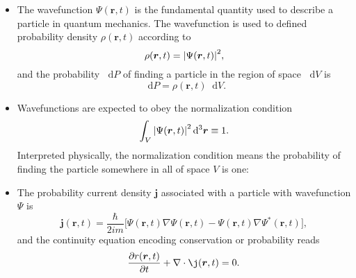\documentclass[11pt, a4paper]{article}
\newcommand{\diff}{\mathop{}\!\mathrm{d}} %
\newcommand{\dr}{\diff^{3} \r}  %
\renewcommand{\div}{\nabla \cdot}
\renewcommand{\grad}{\nabla}
\renewcommand{\vec}[1]{\bm{#1}}  %
\renewcommand{\r}{\vec{r}}  %
\renewcommand{\P}{\Psi}  %
\begin{document}
\begin{itemize}
    \item The wavefunction $ \Psi(\r, t) $ is the fundamental quantity used to describe a particle in quantum mechanics. The wavefunction is used to defined probability density $ \rho(\r, t) $ according to
	\begin{equation*}
		\rho (\r, t) = \abs{\P(\r, t)}^{2},
	\end{equation*}
	and the probability $ \diff P $ of finding a particle in the region of space $ \diff V $ is
	\begin{equation*}
		\diff P = \rho(\r, t) \diff V.
	\end{equation*}

    \item Wavefunctions are expected to obey the normalization condition
	\begin{equation*}
		\int_{V} \abs{\P(\r, t)}^{2}\dr \equiv 1.
	\end{equation*}
	Interpreted physically, the normalization condition means the probability of finding the particle somewhere in all of space $ V $ is one:
	
    \item The probability current density $ \vec{j} $ associated with a particle with wavefunction $ \Psi $ is
    \begin{equation*}
        \vec{j}(\r, t) = \frac{\hbar}{2im}\big[ \Psi(\r, t)\grad \P(\r, t) - \P(\r, t)\grad \P^{*}(\r, t) \big],
    \end{equation*}
    and the continuity equation encoding conservation or probability reads
    \begin{equation*}
        \pdv{r(\r, t)}{t} + \div \j(\r, t) = 0.
    \end{equation*}
    
\end{itemize} 
    
\end{document}
